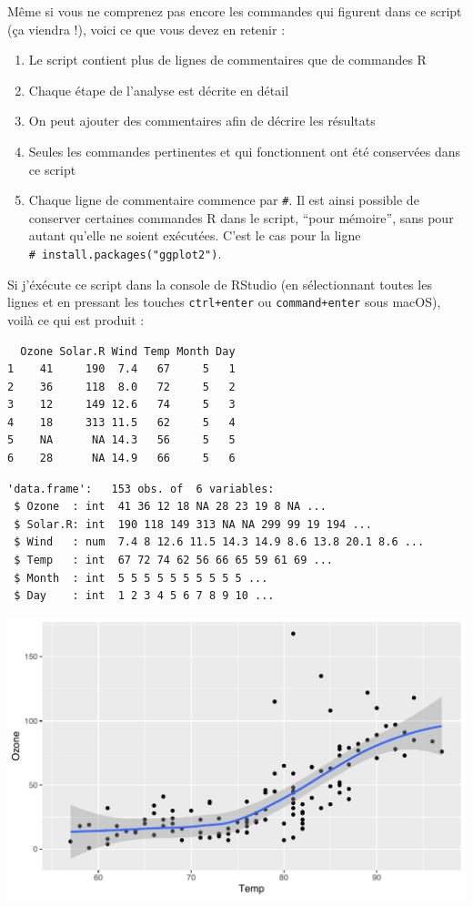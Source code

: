 \documentclass[a4paperpaper,]{article}
\providecommand{\tightlist}{%
  \setlength{\itemsep}{0pt}\setlength{\parskip}{0pt}}
\theoremstyle{definition}
\theoremstyle{definition}
\theoremstyle{definition}
\theoremstyle{remark}
\begin{document}
Même si vous ne comprenez pas encore les commandes qui figurent dans ce
script (ça viendra !), voici ce que vous devez en retenir :

\begin{enumerate}
\def\labelenumi{\arabic{enumi}.}
\tightlist
\item
  Le script contient plus de lignes de commentaires que de commandes R
\item
  Chaque étape de l'analyse est décrite en détail
\item
  On peut ajouter des commentaires afin de décrire les résultats
\item
  Seules les commandes pertinentes et qui fonctionnent ont été
  conservées dans ce script
\item
  Chaque ligne de commentaire commence par \texttt{\#}. Il est ainsi
  possible de conserver certaines commandes R dans le script, ``pour
  mémoire'', sans pour autant qu'elle ne soient exécutées. C'est le cas
  pour la ligne \texttt{\#\ install.packages("ggplot2")}.
\end{enumerate}

Si j'éxécute ce script dans la console de RStudio (en sélectionnant
toutes les lignes et en pressant les touches \texttt{ctrl+enter} ou
\texttt{command+enter} sous macOS), voilà ce qui est produit :

\begin{verbatim}
  Ozone Solar.R Wind Temp Month Day
1    41     190  7.4   67     5   1
2    36     118  8.0   72     5   2
3    12     149 12.6   74     5   3
4    18     313 11.5   62     5   4
5    NA      NA 14.3   56     5   5
6    28      NA 14.9   66     5   6
\end{verbatim}

\begin{verbatim}
'data.frame':   153 obs. of  6 variables:
 $ Ozone  : int  41 36 12 18 NA 28 23 19 8 NA ...
 $ Solar.R: int  190 118 149 313 NA NA 299 99 19 194 ...
 $ Wind   : num  7.4 8 12.6 11.5 14.3 14.9 8.6 13.8 20.1 8.6 ...
 $ Temp   : int  67 72 74 62 56 66 65 59 61 69 ...
 $ Month  : int  5 5 5 5 5 5 5 5 5 5 ...
 $ Day    : int  1 2 3 4 5 6 7 8 9 10 ...
\end{verbatim}

\begin{center}\includegraphics[width=0.9\linewidth]{figure/unnamed-chunk-5-1} \end{center}
\end{document}

